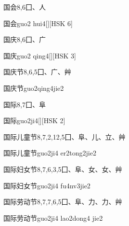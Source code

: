 \begin{Entry}{国会}{8,6}{⼞、⼈}
  \begin{Phonetics}{国会}{guo2 hui4}[][HSK 6]
  \end{Phonetics}
\end{Entry}

\begin{Entry}{国庆}{8,6}{⼞、⼴}
  \begin{Phonetics}{国庆}{guo2 qing4}[][HSK 3]
  \end{Phonetics}
\end{Entry}

\begin{Entry}{国庆节}{8,6,5}{⼞、⼴、⾋}
  \begin{Phonetics}{国庆节}{guo2qing4jie2}
  \end{Phonetics}
\end{Entry}

\begin{Entry}{国际}{8,7}{⼞、⾩}
  \begin{Phonetics}{国际}{guo2ji4}[][HSK 2]
  \end{Phonetics}
\end{Entry}

\begin{Entry}{国际儿童节}{8,7,2,12,5}{⼞、⾩、⼉、⽴、⾋}
  \begin{Phonetics}{国际儿童节}{guo2ji4 er2tong2jie2}
  \end{Phonetics}
\end{Entry}

\begin{Entry}{国际妇女节}{8,7,6,3,5}{⼞、⾩、⼥、⼥、⾋}
  \begin{Phonetics}{国际妇女节}{guo2ji4 fu4nv3jie2}
  \end{Phonetics}
\end{Entry}

\begin{Entry}{国际劳动节}{8,7,7,6,5}{⼞、⾩、⼒、⼒、⾋}
  \begin{Phonetics}{国际劳动节}{guo2ji4 lao2dong4 jie2}
  \end{Phonetics}
\end{Entry}

